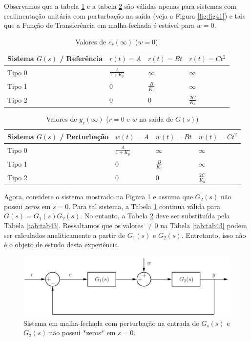 \documentclass[
]{book}
\theoremstyle{definition}
\theoremstyle{definition}
\theoremstyle{definition}
\theoremstyle{remark}
\begin{document}
Observamos que a tabela \ref{tab:tab41} e a tabela \ref{tab:tab42} são válidas apenas para sistemas com realimentação unitária com perturbação na saída (veja a Figura \ref{fig:fig41}) e tais que a Função de Transferência em malha-fechada é estável para \(w=0\).

\begin{table}

\caption{\label{tab:tab41}Valores de $e_r(\infty)$ ($w=0$)}
\centering
\begin{tabular}[t]{llll}
\toprule
Sistema $G(s)$ / Referência & $r(t)=A$ & $r(t) = Bt$ & $r(t) = Ct^2$\\
\midrule
Tipo 0 & $\frac{A}{1 + K_p}$ & $\infty$ & $\infty$\\
Tipo 1 & 0 & $\frac{B}{K_v}$ & $\infty$\\
Tipo 2 & 0 & 0 & $\frac{2C}{K_a}$\\
\bottomrule
\end{tabular}
\end{table}

\begin{table}

\caption{\label{tab:tab42}Valores de $y_r(\infty)$ ($r=0$ e $w$ na saída de $G(s)$)}
\centering
\begin{tabular}[t]{llll}
\toprule
Sistema $G(s)$ / Perturbação & $w(t)=A$ & $w(t) = Bt$ & $w(t) = Ct^2$\\
\midrule
Tipo 0 & $\frac{A}{1 + K_p}$ & $\infty$ & $\infty$\\
Tipo 1 & 0 & $\frac{B}{K_v}$ & $\infty$\\
Tipo 2 & 0 & 0 & $\frac{2C}{K_a}$\\
\bottomrule
\end{tabular}
\end{table}

Agora, considere o sistema mostrado na Figura \ref{fig:fig42} e assuma que \(G_2(s)\) não possui \emph{zeros} em \(s=0\). Para tal sistema, a Tabela \ref{tab:tab41} continua válida para \(G(s) = G_1(s)G_2(s)\). No entanto, a Tabela \ref{tab:tab42} deve ser substituída pela Tabela \ref{tab:tab43}. Ressaltamos que os valores \(\neq 0\) na Tabela \ref{tab:tab43} podem ser calculados analiticamente a partir de \(G_1(s) \text{ e } G_2(s)\). Entretanto, isso não é o objeto de estudo desta experiência.

\begin{figure}
\includegraphics[width=0.8\linewidth]{Imagens/Lab4/Apresentação/fig2} \caption{Sistema em malha-fechada com perturbação na entrada de $G_s(s)$ e $G_2(s)$ não possui *zeros* em $s=0$.}\label{fig:fig42}
\end{figure}
\end{document}
